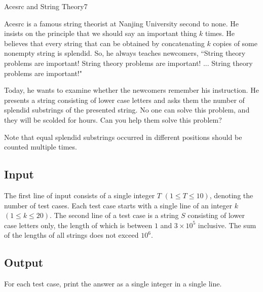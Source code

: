 \begin{Problem}{Acesrc and String Theory}{7}

Acesrc is a famous string theorist at Nanjing University second to none. He insists on the principle that we should say an important thing $k$ times. He believes that every string that can be obtained by concatenating $k$ copies of some nonempty string is splendid. So, he always teaches newcomers, ``String theory problems are important! String theory problems are important! ... String theory problems are important!"

Today, he wants to examine whether the newcomers remember his instruction. He presents a string consisting of lower case letters and asks them the number of splendid substrings of the presented string. No one can solve this problem, and they will be scolded for hours. Can you help them solve this problem?

Note that equal splendid substrings occurred in different positions should be counted multiple times.

\subsection*{Input}

The first line of input consists of a single integer $T$ $(1 \leq T \leq 10)$, denoting the number of test cases. Each test case starts with a single line of an integer $k$ $(1 \leq k \leq 20)$. The second line of a test case is a string $S$ consisting of lower case letters only, the length of which is between $1$ and $3 \times 10^5$ inclusive. The sum of the lengths of all strings does not exceed $10^6$.

\subsection*{Output}

For each test case, print the answer as a single integer in a single line.


\end{Problem}

